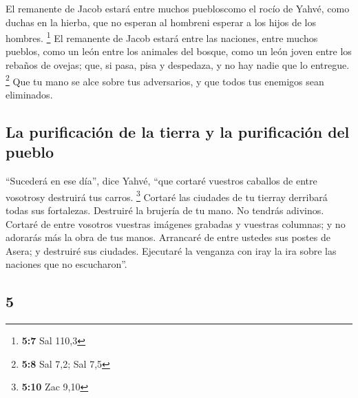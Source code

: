 \begin{paracol}{2}
 El remanente de Jacob estará entre muchos puebloscomo el
rocío de Yahvé, como duchas en la hierba, que no esperan al hombreni
esperar a los hijos de los hombres. \footnote{\textbf{5:7} Sal 110,3}
 El remanente de Jacob estará entre las naciones, entre
muchos pueblos, como un león entre los animales del bosque, como un león
joven entre los rebaños de ovejas; que, si pasa, pisa y despedaza, y no
hay nadie que lo entregue. \footnote{\textbf{5:8} Sal 7,2; Sal 7,5}
 Que tu mano se alce sobre tus adversarios, y que todos
tus enemigos sean eliminados.

\hypertarget{la-purificaciuxf3n-de-la-tierra-y-la-purificaciuxf3n-del-pueblo}{%
\subsection{La purificación de la tierra y la purificación del
pueblo}\label{la-purificaciuxf3n-de-la-tierra-y-la-purificaciuxf3n-del-pueblo}}

 ``Sucederá en ese día'', dice Yahvé, ``que cortaré
vuestros caballos de entre vosotrosy destruirá tus carros. \footnote{\textbf{5:10}
  Zac 9,10}  Cortaré las ciudades de tu tierray derribará
todas sus fortalezas.  Destruiré la brujería de tu mano.
No tendrás adivinos.  Cortaré de entre vosotros vuestras
imágenes grabadas y vuestras columnas; y no adorarás más la obra de tus
manos.  Arrancaré de entre ustedes sus postes de Asera; y
destruiré sus ciudades.  Ejecutaré la venganza con iray
la ira sobre las naciones que no escucharon''.

\switchcolumn
\begin{otherlanguage}{english}

\hypertarget{section-9}{%
\section{5}\label{section-9}}


\end{otherlanguage}
\end{paracol}
